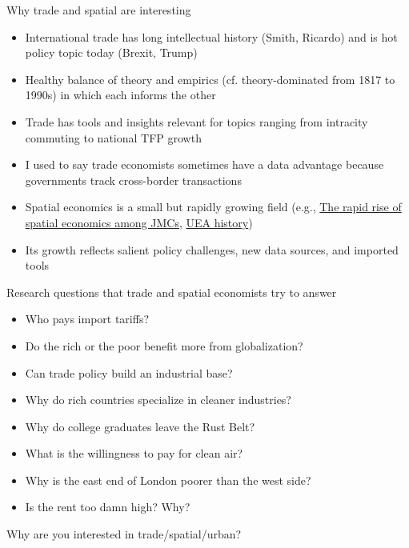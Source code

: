 \documentclass[10pt,notes=hide,aspectratio=169]{beamer}
\begin{document}
\begin{frame}{Why trade and spatial are interesting}
\begin{itemize}
	\item International trade has long intellectual history (Smith, Ricardo) and is hot policy topic today (Brexit, Trump)
	\item Healthy balance of theory and empirics (cf. theory-dominated from 1817 to 1990s) in which each informs the other
	\item Trade has tools and insights relevant for topics ranging from intracity commuting to national TFP growth
	\item I used to say trade economists sometimes have a data advantage because governments track cross-border transactions
	\item Spatial economics is a small but rapidly growing field (e.g., \href{https://tradediversion.net/2019/11/11/the-rapid-rise-of-spatial-economics-among-jmcs/}{The rapid rise of spatial economics among JMCs}, \href{https://urbaneconomics.org/about/history.html}{UEA history})
	\item Its growth reflects salient policy challenges, new data sources, and imported tools
\end{itemize}
\end{frame}
\begin{frame}{Research questions that trade and spatial economists try to answer}
\begin{itemize}
\item Who pays import tariffs?
\item Do the rich or the poor benefit more from globalization?
\item Can trade policy build an industrial base?
\item Why do rich countries specialize in cleaner industries?
\item Why do college graduates leave the Rust Belt?
\item What is the willingness to pay for clean air?
\item Why is the east end of London poorer than the west side?
\item Is the rent too damn high? Why?
\end{itemize}
\vspace{4mm}
Why are you interested in trade/spatial/urban?
\end{frame}
\end{document}
